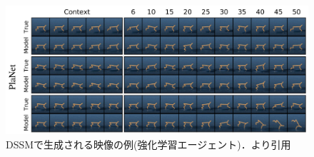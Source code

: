 \begin{figure}[h]
  \begin{center}
    \includegraphics[width=0.8\linewidth]{./figures/dssm_planet.png}
    \caption[DSSMで生成される映像の例(強化学習エージェント)]{DSSMで生成される映像の例(強化学習エージェント)．\cite{hafner2019planet}より引用}
    \label{fig:dssm_planet}
  \end{center}
\end{figure}

